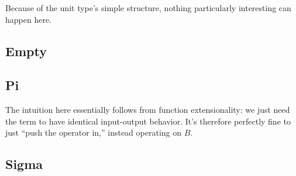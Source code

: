 \documentclass[11pt]{article}
\begin{document}
Because of the unit type's simple structure, nothing particularly interesting can happen here.

\subsection{Empty}

\begin{prooftree*}
\end{prooftree*}

\begin{prooftree*}
\end{prooftree*}

\subsection{Pi}

\begin{prooftree*}
\end{prooftree*}

\begin{prooftree*}
\end{prooftree*}

The intuition here essentially follows from function extensionality: we just need the term to have identical input-output behavior. It's therefore perfectly fine to just ``push the operator in,'' instead operating on $B$.

\subsection{Sigma}
\end{document}
